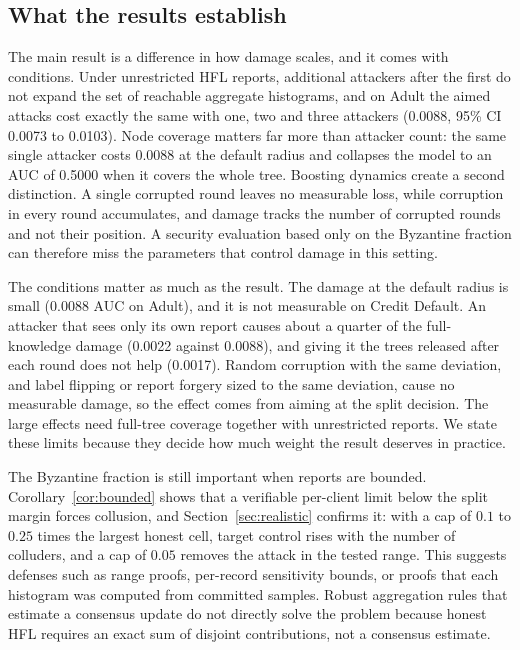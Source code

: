 \documentclass[11pt]{article}
\begin{document}
\subsection{What the results establish}

The main result is a difference in how damage scales, and it comes with conditions. Under unrestricted HFL reports, additional attackers after the first do not expand the set of reachable aggregate histograms, and on Adult the aimed attacks cost exactly the same with one, two and three attackers (0.0088, 95\% CI 0.0073 to 0.0103). Node coverage matters far more than attacker count: the same single attacker costs 0.0088 at the default radius and collapses the model to an AUC of 0.5000 when it covers the whole tree. Boosting dynamics create a second distinction. A single corrupted round leaves no measurable loss, while corruption in every round accumulates, and damage tracks the number of corrupted rounds and not their position. A security evaluation based only on the Byzantine fraction can therefore miss the parameters that control damage in this setting.

The conditions matter as much as the result. The damage at the default radius is small (0.0088 AUC on Adult), and it is not measurable on Credit Default. An attacker that sees only its own report causes about a quarter of the full-knowledge damage (0.0022 against 0.0088), and giving it the trees released after each round does not help (0.0017). Random corruption with the same deviation, and label flipping or report forgery sized to the same deviation, cause no measurable damage, so the effect comes from aiming at the split decision. The large effects need full-tree coverage together with unrestricted reports. We state these limits because they decide how much weight the result deserves in practice.

The Byzantine fraction is still important when reports are bounded. Corollary~\ref{cor:bounded} shows that a verifiable per-client limit below the split margin forces collusion, and Section~\ref{sec:realistic} confirms it: with a cap of $0.1$ to $0.25$ times the largest honest cell, target control rises with the number of colluders, and a cap of $0.05$ removes the attack in the tested range. This suggests defenses such as range proofs, per-record sensitivity bounds, or proofs that each histogram was computed from committed samples. Robust aggregation rules that estimate a consensus update do not directly solve the problem because honest HFL requires an exact sum of disjoint contributions, not a consensus estimate.
\end{document}
